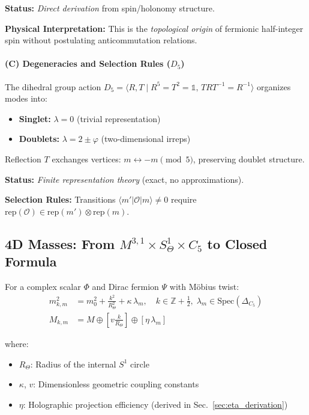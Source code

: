 \documentclass[12pt]{article}
\begin{document}
\textbf{Status:} \textit{Direct derivation} from spin/holonomy structure.

\textbf{Physical Interpretation:} This is the \textit{topological origin} of fermionic half-integer spin without postulating anticommutation relations.

\paragraph{(C) Degeneracies and Selection Rules ($D_5$)}

The dihedral group action $D_5 = \langle R, T \mid R^5 = T^2 = \mathbb{1},\, TRT^{-1} = R^{-1} \rangle$ organizes modes into:
\begin{itemize}
\item \textbf{Singlet:} $\lambda = 0$ (trivial representation)
\item \textbf{Doublets:} $\lambda = 2 \pm \varphi$ (two-dimensional irreps)
\end{itemize}

Reflection $T$ exchanges vertices: $m \leftrightarrow -m \pmod{5}$, preserving doublet structure.

\textbf{Status:} \textit{Finite representation theory} (exact, no approximations).

\textbf{Selection Rules:} Transitions $\langle m' | \mathcal{O} | m \rangle \neq 0$ require $\text{rep}(\mathcal{O}) \in \text{rep}(m') \otimes \text{rep}(m)$.

\subsection{4D Masses: From $M^{3,1} \times S^1_\Theta \times C_5$ to Closed Formula}

For a complex scalar $\Phi$ and Dirac fermion $\Psi$ with M\"obius twist:
\begin{align}
m^2_{k,m} &= m_0^2 + \frac{k^2}{R_\Theta^2} + \kappa \, \lambda_m, \quad k \in \mathbb{Z} + \tfrac{1}{2},\; \lambda_m \in \text{Spec}(\Delta_{C_5}) \label{eq:mass-scalar-full} \\
M_{k,m} &= M \oplus \left[v \frac{k}{R_\Theta}\right] \oplus \left[\eta \, \lambda_m\right] \label{eq:mass-fermion-full}
\end{align}

where:
\begin{itemize}
\item $R_\Theta$: Radius of the internal $S^1$ circle
\item $\kappa$, $v$: Dimensionless geometric coupling constants
\item $\eta$: Holographic projection efficiency (derived in Sec.~\ref{sec:eta_derivation})
\end{itemize}
\end{document}
